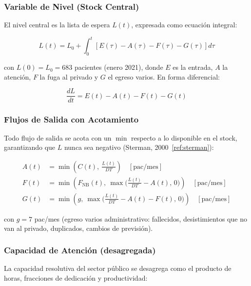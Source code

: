 \documentclass[12pt,a4paper]{article}
\begin{document}
\subsubsection*{Variable de Nivel (Stock Central)}

El nivel central es la lista de espera $L(t)$, expresada como ecuación integral:

\begin{equation}
  \boxed{
    L(t) = L_0 + \int_0^t \left[ E(\tau) - A(\tau) - F(\tau) - G(\tau) \right] d\tau
  }
  \label{eq:nivel}
\end{equation}

con $L(0) = L_0 = 683$ pacientes (enero 2021), donde $E$ es la entrada, $A$ la atención, $F$ la fuga al privado y $G$ el egreso varios. En forma diferencial:

\begin{equation}
  \frac{dL}{dt} = E(t) - A(t) - F(t) - G(t)
\end{equation}

\subsubsection*{Flujos de Salida con Acotamiento}

Todo flujo de salida se acota con un $\min$ respecto a lo disponible en el stock, garantizando que $L$ nunca sea negativo (Sterman, 2000~\ref{ref:sterman}):

\begin{align}
  A(t) & = \min\!\left( C(t),\ \tfrac{L(t)}{DT} \right) \quad [\text{pac/mes}] \label{eq:atencion}                                      \\[4pt]
  F(t) & = \min\!\left( F_{\text{NB}}(t),\ \max\!\bigl(\tfrac{L(t)}{DT} - A(t),\,0\bigr) \right) \quad [\text{pac/mes}] \label{eq:fuga} \\[4pt]
  G(t) & = \min\!\left( g,\ \max\!\bigl(\tfrac{L(t)}{DT} - A(t) - F(t),\,0\bigr) \right) \quad [\text{pac/mes}] \label{eq:egreso}
\end{align}

con $g = 7$ pac/mes (egreso varios administrativo: fallecidos, desistimientos que no van al privado, duplicados, cambios de previsión).

\subsubsection*{Capacidad de Atención (desagregada)}

La capacidad resolutiva del sector público se desagrega como el producto de horas, fracciones de dedicación y productividad:
\end{document}
